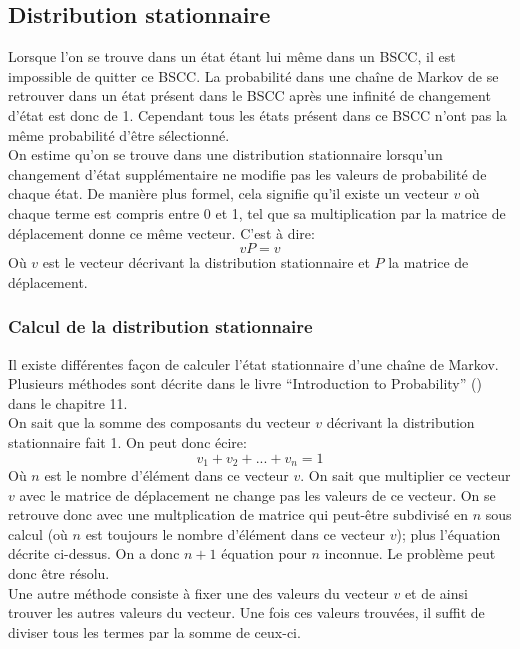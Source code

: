\documentclass[letterpaper]{article}
\begin{document}
  \subsection{Distribution stationnaire}
    Lorsque l'on se trouve dans un état étant lui même dans un BSCC, il est impossible de 
    quitter ce BSCC.  La probabilité dans une chaîne de Markov de se retrouver dans un état
    présent dans le BSCC après une infinité de changement d'état est donc de 1.  Cependant
    tous les états présent dans ce BSCC n'ont pas la même probabilité d'être sélectionné.\\
    On estime qu'on se trouve dans une distribution stationnaire lorsqu'un changement d'état
    supplémentaire ne modifie pas les valeurs de probabilité de chaque état.  De manière plus 
    formel, cela signifie qu'il existe un vecteur $v$ où chaque terme est compris entre 0 et 1,
    tel que sa multiplication par la matrice de déplacement donne ce même vecteur.  C'est à dire:
    $$v P = v$$
    Où $v$ est le vecteur décrivant la distribution stationnaire et $P$ la matrice de déplacement.
    
    \subsubsection{Calcul de la distribution stationnaire}
      \label{etat_stationnaire}
      Il existe différentes façon de calculer l'état stationnaire d'une chaîne de Markov.
      Plusieurs méthodes sont décrite dans le livre ``Introduction to Probability'' (\citep{IP}) 
      dans le chapitre 11.\\
      On sait que la somme des composants du vecteur $v$ décrivant la distribution stationnaire 
      fait 1.  On peut donc écire:
      $$v_1 + v_2 + ... + v_n = 1$$
      Où $n$ est le nombre d'élément dans ce vecteur $v$.  On sait que multiplier ce vecteur $v$
      avec le matrice de déplacement ne change pas les valeurs de ce vecteur.  On se retrouve donc
      avec une multplication de matrice qui peut-être subdivisé en $n$ sous calcul (où $n$ est 
      toujours le nombre d'élément dans ce vecteur $v$); plus l'équation décrite ci-dessus.  On a 
      donc $n+1$ équation pour $n$ inconnue.  Le problème peut donc être résolu.\\
      Une autre méthode consiste à fixer une des valeurs du vecteur $v$ et de ainsi trouver les 
      autres valeurs du vecteur.  Une fois ces valeurs trouvées, il suffit de diviser tous les 
      termes par la somme de ceux-ci.
  
\end{document}
